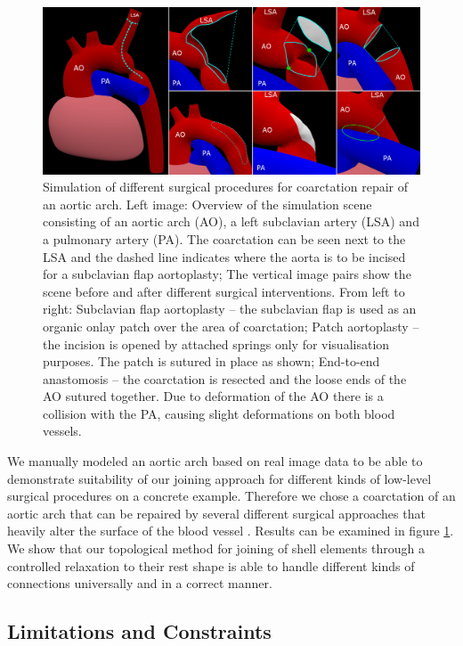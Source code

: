 \begin{figure}[tbh]
  \centering
  \includegraphics[width=\columnwidth]{img/surgery.png}
  \caption{Simulation of different surgical procedures for coarctation repair of an aortic arch. Left image: Overview of the simulation scene consisting of an aortic arch (AO), a left subclavian artery (LSA) and a pulmonary artery (PA). The coarctation can be seen next to the LSA and the dashed line indicates where the aorta is to be incised for a subclavian flap aortoplasty; The vertical image pairs show the scene before and after different surgical interventions. From left to right: Subclavian flap aortoplasty -- the subclavian flap is used as an organic onlay patch over the area of coarctation; Patch aortoplasty -- the incision is opened by attached springs only for visualisation purposes. The patch is sutured in place as shown; End-to-end anastomosis -- the coarctation is resected and the loose ends of the AO sutured together. Due to deformation of the AO there is a collision with the PA, causing slight deformations on both blood vessels. }
  \label{fig-surgery}
\end{figure}

We manually modeled an aortic arch based on real image data to be able to demonstrate suitability of our joining approach for different kinds of low-level surgical procedures on a concrete example. Therefore we chose a coarctation of an aortic arch that can be repaired by several different surgical approaches that heavily alter the surface of the blood vessel \cite{Dodge2000}. Results can be examined in figure \ref{fig-surgery}. We show that our topological method for joining of shell elements through a controlled relaxation to their rest shape is able to handle different kinds of connections universally and in a correct manner.

\subsection{Limitations and Constraints}

